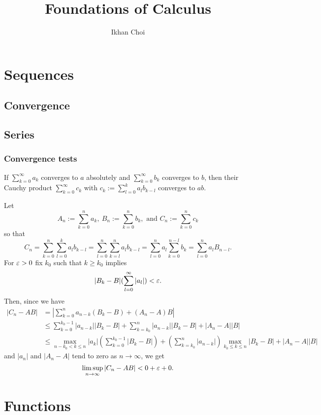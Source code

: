 \documentclass{../note}
\begin{document}
\title{Foundations of Calculus}
\author{Ikhan Choi}
\maketitle
\tableofcontents

\part{Sequences}
\chapter{Convergence}

\chapter{Series}
\section{Convergence tests}
\begin{prb}
If $\sum_{k=0}^\infty a_k$ converges to $a$ absolutely and $\sum_{k=0}^\infty b_k$ converges to $b$, then their Cauchy product $\sum_{k=0}^\infty c_k$ with $c_k:=\sum_{l=0}^ka_lb_{k-l}$ converges to $ab$.
\end{prb}
\begin{pf}
Let
\[A_n:=\sum_{k=0}^na_k,\ B_n:=\sum_{k=0}^nb_k, \text{ and } C_n:=\sum_{k=0}^nc_k\]
so that
\[C_n=\sum_{k=0}^n\sum_{l=0}^ka_lb_{k-l}=\sum_{l=0}^n\sum_{k=l}^na_lb_{k-l}=\sum_{l=0}^na_l\sum_{k=0}^{n-l}b_k=\sum_{l=0}^na_lB_{n-l}.\]
For $\varepsilon>0$ fix $k_0$ such that $k\ge k_0$ implies
\[|B_k-B|(\sum_{l=0}^\infty|a_l|)<\varepsilon.\]
Then, since we have
\begin{align*}
|C_n-AB|&=|\sum_{k=0}^na_{n-k}(B_k-B)+(A_n-A)B|\\
&\le\sum_{k=0}^{k_0-1}|a_{n-k}||B_k-B|+\sum_{k=k_0}^{n}|a_{n-k}||B_k-B|+|A_n-A||B|\\
&\le\max_{n-k_0<k\le n}|a_k|(\sum_{k=0}^{k_0-1}|B_k-B|)+(\sum_{k=k_0}^n|a_{n-k}|)\max_{k_0\le k\le n}|B_k-B|+|A_n-A||B|
\end{align*}
and $|a_n|$ and $|A_n-A|$ tend to zero as $n\to\infty$, we get
\[\limsup_{n\to\infty}|C_n-AB|<0+\varepsilon+0.\]
\end{pf}

\part{Functions}
\end{document}
